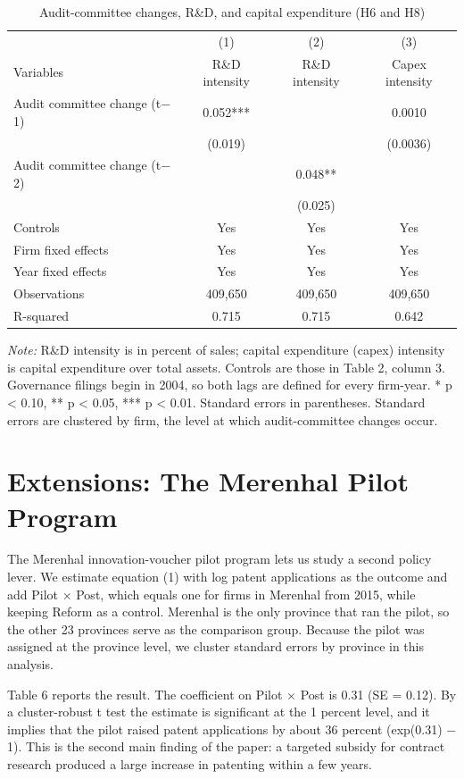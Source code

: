 \documentclass[12pt]{article}
\newcommand{\tabnote}[1]{\par\vspace{2pt}\begin{minipage}{\linewidth}\footnotesize\setstretch{1.0}\textit{Note:} #1\end{minipage}}
\begin{document}
\begin{table}[!htbp]
\centering
\begin{threeparttable}
\caption{Audit-committee changes, R\&D, and capital expenditure (H6 and H8)}
\small
{}
\begin{tabular}{lccc}
\toprule
 & (1) & (2) & (3) \\
Variables & R\&D intensity & R\&D intensity & Capex intensity \\
\midrule
Audit committee change (t$-$1) & 0.052*** & & 0.0010 \\
 & (0.019) & & (0.0036) \\
Audit committee change (t$-$2) & & 0.048** & \\
 & & (0.025) & \\
\midrule
Controls & Yes & Yes & Yes \\
Firm fixed effects & Yes & Yes & Yes \\
Year fixed effects & Yes & Yes & Yes \\
Observations & 409,650 & 409,650 & 409,650 \\
R-squared & 0.715 & 0.715 & 0.642 \\
\bottomrule
\end{tabular}
\tabnote{R\&D intensity is in percent of sales; capital expenditure (capex) intensity is capital expenditure over total assets. Controls are those in Table 2, column 3. Governance filings begin in 2004, so both lags are defined for every firm-year. * p < 0.10, ** p < 0.05, *** p < 0.01. Standard errors in parentheses. Standard errors are clustered by firm, the level at which audit-committee changes occur.}
\end{threeparttable}
\end{table}

\section{Extensions: The Merenhal Pilot Program}

The Merenhal innovation-voucher pilot program lets us study a second policy lever. We estimate equation (1) with log patent applications as the outcome and add Pilot $\times$ Post, which equals one for firms in Merenhal from 2015, while keeping Reform as a control. Merenhal is the only province that ran the pilot, so the other 23 provinces serve as the comparison group. Because the pilot was assigned at the province level, we cluster standard errors by province in this analysis.

Table 6 reports the result. The coefficient on Pilot $\times$ Post is 0.31 (SE = 0.12). By a cluster-robust t test the estimate is significant at the 1 percent level, and it implies that the pilot raised patent applications by about 36 percent (exp(0.31) $-$ 1). This is the second main finding of the paper: a targeted subsidy for contract research produced a large increase in patenting within a few years.
\end{document}
